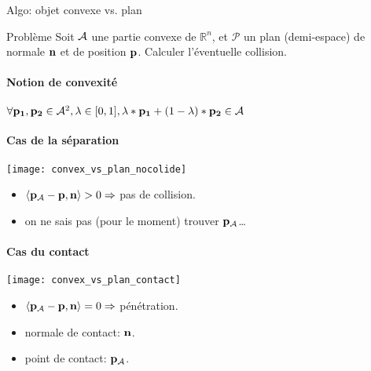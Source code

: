 \begin{frame}[fragile]{Algo: objet convexe vs. plan}
    \begin{block}{Problème}
        Soit $\mathcal{A}$ une partie convexe de $\mathbb{R}^n$, et
        $\mathcal{P}$ un plan (demi-espace) de normale ${\bf n}$ et de position $\textbf{p}$.
        Calculer l’éventuelle collision.
    \end{block}
     {
    \begin{overlayarea}{10cm}{10cm}
    \begin{description}
        \item
         {
            \framesubtitle{Notion de convexité}
            \item[Convexité:]
                $\forall {\bf p_1}, {\bf p_2} \in \mathcal{A}^2, \lambda \in [0, 1], \lambda *
                {\bf p_1} + (1 - \lambda) * {\bf p_2} \in \mathcal{A}$
                \begin{figure}[h]
                    \setcounter{subfigure}{0}
                \end{figure}
        }
\end{description}
        {
            \framesubtitle{Cas de la séparation}
           \begin{center}
               \texttt{[image: convex\_vs\_plan\_nocolide]}
           \end{center}
           \begin{itemize}
               \item $\left< {\bf p_\mathcal{A}} - \textbf{p}, {\bf n} \right> > 0 \Rightarrow$ pas de collision.
               \item on ne sais pas (pour le moment) trouver ${\bf p_\mathcal{A}}$\ldots
           \end{itemize}
       }
        {
            \framesubtitle{Cas du contact}
           \begin{center}
               \texttt{[image: convex\_vs\_plan\_contact]}
           \end{center}
           \begin{itemize}
               \item $\left< {\bf p_\mathcal{A}} - \textbf{p}, {\bf n} \right> = 0 \Rightarrow$ pénétration.
               \item normale de contact: ${\bf n}$.
               \item point de contact: ${\bf p_\mathcal{A}}$.
           \end{itemize}
}
\end{overlayarea}}
\end{frame}
